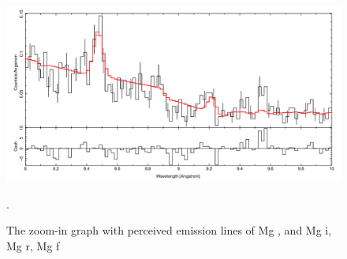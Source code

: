 \begin{figure}[h!]
    \centering
    \includegraphics[width=1\linewidth]{Chapters/Figures/zoomin3.png}
    \caption{The zoom-in graph with perceived emission lines of Mg {\footnotesize{}}, and Mg {\footnotesize{}i}, Mg {\footnotesize{}r}, Mg {\footnotesize{}f}}.
    \label{fig:zoomin3}
\end{figure}

\clearpage

    
